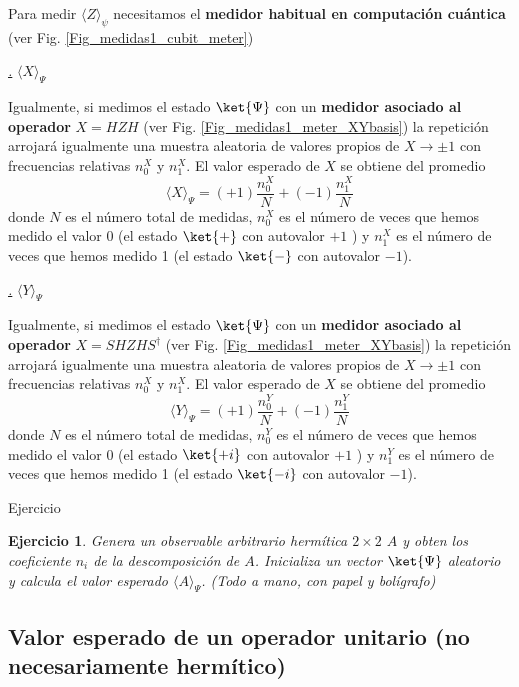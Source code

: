 \documentclass[a4paper,11pt]{book} %
\newtheorem{ejercicio_contador}{Ejercicio}
\newcommand{\Ejercicio}[1]{
		\begin{mybox_gray}{Ejercicio} 
			\begin{ejercicio_contador}
				 #1 
			\end{ejercicio_contador} 
		\end{mybox_gray}
	}
\numberwithin{equation}{chapter}
\def\subsubiContadorIt{\par\addtocounter{subsubsection}{1}\underline{\it\thesubsubsection.}\hskip0.5cm \setcounter{subsubsubsectionIt}{0}}
\newcommand{\SubsubiIt}[1]{
		\subsubiContadorIt \textit{#1}
	}
\newcounter{subsubsubsectionIt}[subsubsection]
\begin{document}
Para medir $\langle Z\rangle_\psi$ necesitamos el \textbf{medidor habitual en computación cuántica} (ver Fig. \ref{Fig_medidas1_cubit_meter})
			
			\SubsubiIt{$\langle X \rangle_\Psi$} 
			
Igualmente, si medimos el estado $\ket{\Psi}$ con un \textbf{medidor asociado al operador} $X = HZH$ (ver Fig. \ref{Fig_medidas1_meter_XYbasis}) la repetición arrojará igualmente una muestra aleatoria de valores propios de $X\to \pm 1$ con frecuencias relativas $n^X_0$ y $n^X_1$.
El valor esperado de $X$ se obtiene del promedio
	\begin{equation} \label{ec_medidas1_valor_esperado_Z}
	\boxed{\langle X \rangle_\Psi = (+1)\frac{n^X_{0}}{N}+ (-1) \frac{ n^X_{1}}{N}}
	\end{equation}
donde $N$ es el número total de medidas, $n_{0}^X$ es el número de veces que hemos medido el valor 0 (el estado $\ket{+}$ con autovalor $+1$ ) y $n_{1}^X$ es el número de veces que hemos medido 1 (el estado $\ket{-}$ con autovalor $-1$).
			
			\SubsubiIt{$\langle Y \rangle_\Psi$} 
			
Igualmente, si medimos el estado $\ket{\Psi}$ con un \textbf{medidor asociado al operador} $X = SHZHS^\dagger$ (ver Fig. \ref{Fig_medidas1_meter_XYbasis}) la repetición arrojará igualmente una muestra aleatoria de valores propios de $X\to \pm 1$ con frecuencias relativas $n^X_0$ y $n^X_1$.
El valor esperado de $X$ se obtiene del promedio
	\begin{equation} \label{ec_medidas1_valor_esperado_Z}
	\boxed{\langle Y \rangle_\Psi = (+1)\frac{n^Y_{0}}{N}+ (-1) \frac{ n^Y_{1}}{N}}
	\end{equation}
donde $N$ es el número total de medidas, $n_{0}^Y$ es el número de veces que hemos medido el valor 0 (el estado $\ket{+i}$ con autovalor $+1$ ) y $n_{1}^Y$ es el número de veces que hemos medido 1 (el estado $\ket{-i}$ con autovalor $-1$).		


	\Ejercicio{
	Genera un observable arbitrario hermítica $2\times 2$ $A$ y obten los coeficiente $n_i$ de la descomposición de $A$. 
	Inicializa un vector $\ket{\Psi}$ aleatorio y calcula el valor esperado $\langle A \rangle_\Psi$. (Todo a mano, con papel y bolígrafo)
	}
	


        \subsection{Valor esperado de un operador unitario (no necesariamente hermítico)}
        
\end{document}
